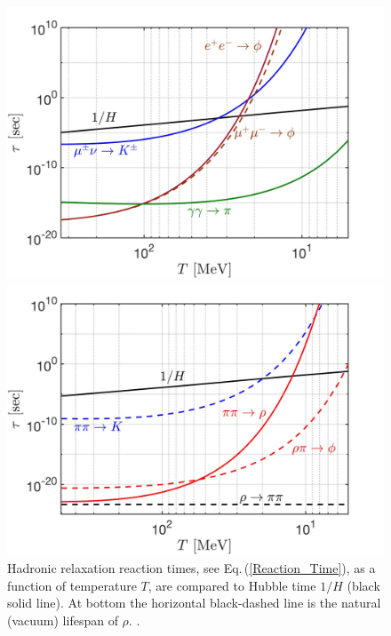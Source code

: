 \begin{figure}
\centerline{\includegraphics[width=0.9\linewidth]{./plots/Strangeness_Hubble002.jpg}}
\centerline{\includegraphics[width=0.9\linewidth]{./plots/Strangeness_Hubble003.jpg}}
\caption{Hadronic relaxation reaction times, see Eq.\,(\ref{Reaction_Time}), as a function of temperature $T$, are compared to Hubble time $1/H$ (black solid line). At bottom the horizontal black-dashed line is the natural (vacuum) lifespan of $\rho$. . }
\label{reaction_time_tot} 
\end{figure}

